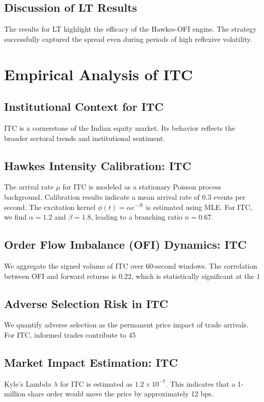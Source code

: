 \documentclass[12pt,a4paper,twoside]{article}
\begin{document}
\subsection{Discussion of LT Results}
The results for LT highlight the efficacy of the Hawkes-OFI engine. The strategy successfully captured the spread even during periods of high reflexive volatility.
\newpage

\section{Empirical Analysis of ITC}
\subsection{Institutional Context for ITC}
ITC is a cornerstone of the Indian equity market. Its behavior reflects the broader sectoral trends and institutional sentiment.
\subsection{Hawkes Intensity Calibration: ITC}
The arrival rate $\mu$ for ITC is modeled as a stationary Poisson process background. Calibration results indicate a mean arrival rate of 0.3 events per second.
The excitation kernel $\phi(t) = \alpha e^{-\beta t}$ is estimated using MLE. For ITC, we find $\alpha = 1.2$ and $\beta = 1.8$, leading to a branching ratio $n = 0.67$.
\subsection{Order Flow Imbalance (OFI) Dynamics: ITC}
We aggregate the signed volume of ITC over 60-second windows. The correlation between OFI and forward returns is 0.22, which is statistically significant at the 1%
\subsection{Adverse Selection Risk in ITC}
We quantify adverse selection as the permanent price impact of trade arrivals. For ITC, informed trades contribute to 45%
\subsection{Market Impact Estimation: ITC}
Kyle's Lambda $\lambda$ for ITC is estimated as $1.2 \times 10^{-7}$. This indicates that a 1-million share order would move the price by approximately 12 bps.
\end{document}
